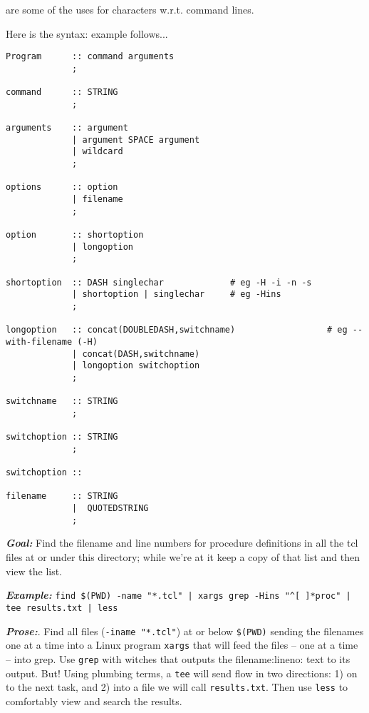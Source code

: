 are some of the uses for characters w.r.t. command lines.

Here is the syntax: example follows...

\begingroup \fontsize{10pt}{10pt}
\selectfont
\begin{verbatim} 
Program      :: command arguments
             ;

command      :: STRING
             ;

arguments    :: argument
             | argument SPACE argument
             | wildcard
             ;

options      :: option
             | filename
             ;

option       :: shortoption
             | longoption
             ;

shortoption  :: DASH singlechar             # eg -H -i -n -s
             | shortoption | singlechar     # eg -Hins
             ;

longoption   :: concat(DOUBLEDASH,switchname)                  # eg --with-filename (-H)
             | concat(DASH,switchname)
             | longoption switchoption
             ;

switchname   :: STRING
             ;

switchoption :: STRING
             ;

switchoption :: 

filename     :: STRING
             |  QUOTEDSTRING
             ;

\end{verbatim}
\endgroup

\textbf{\emph{Goal:}} Find the filename and line numbers for procedure definitions in
all the tcl files at or under this directory; while we're at it
keep a copy of that list and then view the list.

\textbf{\emph{Example:}}
\verb=find $(PWD) -name "*.tcl" | xargs grep -Hins "^[ ]*proc" | tee results.txt | less=

\textbf{\emph{Prose:}}. Find all files (\verb=-iname "*.tcl"=) at or
below \verb=$(PWD)= sending the filenames one at a time into a
Linux program \verb=xargs= that will feed the files -- one at a time -- into
grep. Use \verb=grep= with witches that outputs the filename:lineno: text
to its output. But! Using plumbing terms, a \verb=tee= will send flow
in two directions: 1) on to the next task, and 2) into a file we
will call \verb=results.txt=. Then use \verb=less= to comfortably
view and search the results. 

